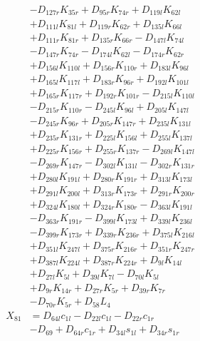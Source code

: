 \begin{multicols}{2}
\begin{align}
&- D_{127r}K_{35r} + D_{95r}K_{74r} + D_{119l}K_{62l}  \nonumber \\
&+ D_{111l}K_{81l} + D_{119r}K_{62r} + D_{135l}K_{66l}  \nonumber \\
&+ D_{111r}K_{81r} + D_{135r}K_{66r} - D_{147l}K_{74l}  \nonumber \\
&- D_{147r}K_{74r} - D_{174l}K_{62l} - D_{174r}K_{62r}  \nonumber \\
&+ D_{156l}K_{110l} + D_{156r}K_{110r} + D_{183l}K_{96l}  \nonumber \\
&+ D_{165l}K_{117l} + D_{183r}K_{96r} + D_{192l}K_{101l}  \nonumber \\
&+ D_{165r}K_{117r} + D_{192r}K_{101r} - D_{215l}K_{110l}  \nonumber \\
&- D_{215r}K_{110r} - D_{245l}K_{96l} + D_{205l}K_{147l}  \nonumber \\
&- D_{245r}K_{96r} + D_{205r}K_{147r} + D_{235l}K_{131l}  \nonumber \\
&+ D_{235r}K_{131r} + D_{225l}K_{156l} + D_{255l}K_{137l}  \nonumber \\
&+ D_{225r}K_{156r} + D_{255r}K_{137r} - D_{269l}K_{147l}  \nonumber \\
&- D_{269r}K_{147r} - D_{302l}K_{131l} - D_{302r}K_{131r}  \nonumber \\
&+ D_{280l}K_{191l} + D_{280r}K_{191r} + D_{313l}K_{173l}  \nonumber \\
&+ D_{291l}K_{200l} + D_{313r}K_{173r} + D_{291r}K_{200r}  \nonumber \\
&+ D_{324l}K_{180l} + D_{324r}K_{180r} - D_{363l}K_{191l}  \nonumber \\
&- D_{363r}K_{191r} - D_{399l}K_{173l} + D_{339l}K_{236l}  \nonumber \\
&- D_{399r}K_{173r} + D_{339r}K_{236r} + D_{375l}K_{216l}  \nonumber \\
&+ D_{351l}K_{247l} + D_{375r}K_{216r} + D_{351r}K_{247r}  \nonumber \\
&+ D_{387l}K_{224l} + D_{387r}K_{224r} + D_{9l}K_{14l}  \nonumber \\
&+ D_{27l}K_{5l} + D_{39l}K_{7l} - D_{70l}K_{5l}  \nonumber \\
&+ D_{9r}K_{14r} + D_{27r}K_{5r} + D_{39r}K_{7r}  \nonumber \\
&- D_{70r}K_{5r} + D_{58}L_4 \nonumber \\
X_{81} &= D_{64l}c_{1l} - D_{22l}c_{1l} - D_{22r}c_{1r}  \nonumber \\
&- D_{69} + D_{64r}c_{1r} + D_{34l}s_{1l} + D_{34r}s_{1r}  \nonumber \\

\end{align}
\end{multicols}
